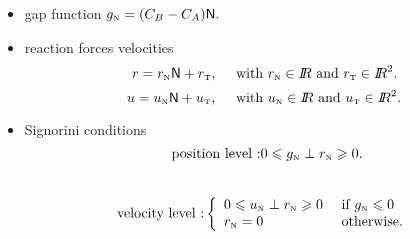 {\begin{minipage}[c]{0.45\linewidth}
\begin{tikzpicture}
    \end{tikzpicture}
  \end{minipage}
\begin{minipage}[c]{0.49\linewidth}
    \begin{itemize}
    \item gap function $ g_{\n} = (C_B-C_A) \sf N.$
    \item reaction forces velocities
      $$ r =  r_\n {\sf N} + r_\t, \quad \text{ with  } r_\n \in \RR \text{ and } r_\t \in \RR^2.$$
      $$u =  u_\n {\sf N} + u_\t, \quad \text{ with } u_\n \in \RR \text{ and } u_\t \in \RR^2.$$
    \item Signorini conditions
      $$  \text{ position level :}  0 \leq g_{\n} \perp r_\n \geq 0.$$\\
      $$ \text{velocity level :}\left\{\begin{array}{ll}
            0 \leq u_{\n} \perp r_\n \geq 0  &\text{ if } g_{\n} \leq 0\\
            r_{\n} =0 &\text{ otherwise}.
          \end{array}\right.$$
    \end{itemize}

  \end{minipage}
}
